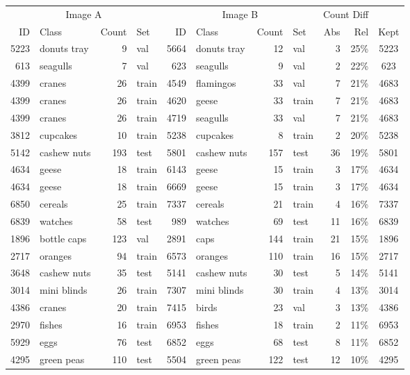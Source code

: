 \begin{tabular}{rlrlrlrlrrc}
 \toprule
\multicolumn{4}{c}{Image A} & \multicolumn{4}{c}{Image B} & \multicolumn{2}{c}{Count Diff} \\
ID & Class & Count & Set & ID & Class & Count & Set & Abs & Rel & Kept\\
\cmidrule(r){1-4} \cmidrule(r){5-8} \cmidrule(r){9-10} \cmidrule(r){11-11} 
5223 & donuts tray & 9 & val & 5664 & donuts tray & 12 & val & 3 & 25\% & 5223\\
613 & seagulls & 7 & val & 623 & seagulls & 9 & val & 2 & 22\% & 623\\
4399 & cranes & 26 & train & 4549 & flamingos & 33 & val & 7 & 21\% & 4683\\
4399 & cranes & 26 & train & 4620 & geese & 33 & train & 7 & 21\% & 4683\\
4399 & cranes & 26 & train & 4719 & seagulls & 33 & val & 7 & 21\% & 4683\\
3812 & cupcakes & 10 & train & 5238 & cupcakes & 8 & train & 2 & 20\% & 5238 \\
5142 & cashew nuts & 193 & test & 5801 & cashew nuts & 157 & test & 36 & 19\% & 5801\\
4634 & geese & 18 & train & 6143 & geese & 15 & train & 3 & 17\% & 4634\\
4634 & geese & 18 & train & 6669 & geese & 15 & train & 3 & 17\% & 4634 \\
6850 & cereals & 25 & train & 7337 & cereals & 21 & train & 4 & 16\% & 7337\\
6839 & watches & 58 & test & 989 & watches & 69 & test & 11 & 16\% & 6839\\
1896 & bottle caps & 123 & val & 2891 & caps & 144 & train & 21 & 15\% & 1896\\
2717 & oranges & 94 & train & 6573 & oranges & 110 & train & 16 & 15\% & 2717\\
3648 & cashew nuts & 35 & test & 5141 & cashew nuts & 30 & test & 5 & 14\% & 5141\\
3014 & mini blinds & 26 & train & 7307 & mini blinds & 30 & train & 4 & 13\% & 3014 \\
4386 & cranes & 20 & train & 7415 & birds & 23 & val & 3 & 13\% & 4386\\
2970 & fishes & 16 & train & 6953 & fishes & 18 & train & 2 & 11\% & 6953\\
5929 & eggs & 76 & test & 6852 & eggs & 68 & test & 8 & 11\% & 6852\\
4295 & green peas & 110 & test & 5504 & green peas & 122 & test & 12 & 10\% & 4295\\

\end{tabular}
